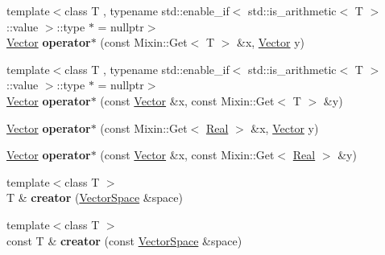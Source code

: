 \begin{DoxyCompactItemize}
\item 
\hypertarget{namespaceSpacy_a0e5e7a61e6d2996df2b3e86371d38dfa}{{\footnotesize template$<$class T , typename std\-::enable\-\_\-if$<$ std\-::is\-\_\-arithmetic$<$ T $>$\-::value $>$\-::type $\ast$  = nullptr$>$ }\\\hyperlink{classSpacy_1_1Vector}{\-Vector} {\bfseries operator$\ast$} (const \-Mixin\-::\-Get$<$ \-T $>$ \&x, \hyperlink{classSpacy_1_1Vector}{\-Vector} y)}\label{namespaceSpacy_a0e5e7a61e6d2996df2b3e86371d38dfa}

\item 
\hypertarget{namespaceSpacy_a6656b636307ec4d5552477027b724f46}{{\footnotesize template$<$class T , typename std\-::enable\-\_\-if$<$ std\-::is\-\_\-arithmetic$<$ T $>$\-::value $>$\-::type $\ast$  = nullptr$>$ }\\\hyperlink{classSpacy_1_1Vector}{\-Vector} {\bfseries operator$\ast$} (const \hyperlink{classSpacy_1_1Vector}{\-Vector} \&x, const \-Mixin\-::\-Get$<$ \-T $>$ \&y)}\label{namespaceSpacy_a6656b636307ec4d5552477027b724f46}

\item 
\hypertarget{namespaceSpacy_a011c3af8fa33fc2da22f9667edaeba29}{\hyperlink{classSpacy_1_1Vector}{\-Vector} {\bfseries operator$\ast$} (const \-Mixin\-::\-Get$<$ \hyperlink{classSpacy_1_1Real}{\-Real} $>$ \&x, \hyperlink{classSpacy_1_1Vector}{\-Vector} y)}\label{namespaceSpacy_a011c3af8fa33fc2da22f9667edaeba29}

\item 
\hypertarget{namespaceSpacy_a7ad73bdbb0377bd088f1007894a4a824}{\hyperlink{classSpacy_1_1Vector}{\-Vector} {\bfseries operator$\ast$} (const \hyperlink{classSpacy_1_1Vector}{\-Vector} \&x, const \-Mixin\-::\-Get$<$ \hyperlink{classSpacy_1_1Real}{\-Real} $>$ \&y)}\label{namespaceSpacy_a7ad73bdbb0377bd088f1007894a4a824}

\item 
\hypertarget{namespaceSpacy_affaca762d59da675eef594854762cdcd}{{\footnotesize template$<$class T $>$ }\\\-T \& {\bfseries creator} (\hyperlink{classSpacy_1_1VectorSpace}{\-Vector\-Space} \&space)}\label{namespaceSpacy_affaca762d59da675eef594854762cdcd}

\item 
\hypertarget{namespaceSpacy_aed55e3a3401be0e74e174a12858baffa}{{\footnotesize template$<$class T $>$ }\\const \-T \& {\bfseries creator} (const \hyperlink{classSpacy_1_1VectorSpace}{\-Vector\-Space} \&space)}\label{namespaceSpacy_aed55e3a3401be0e74e174a12858baffa}


\end{DoxyCompactItemize}
